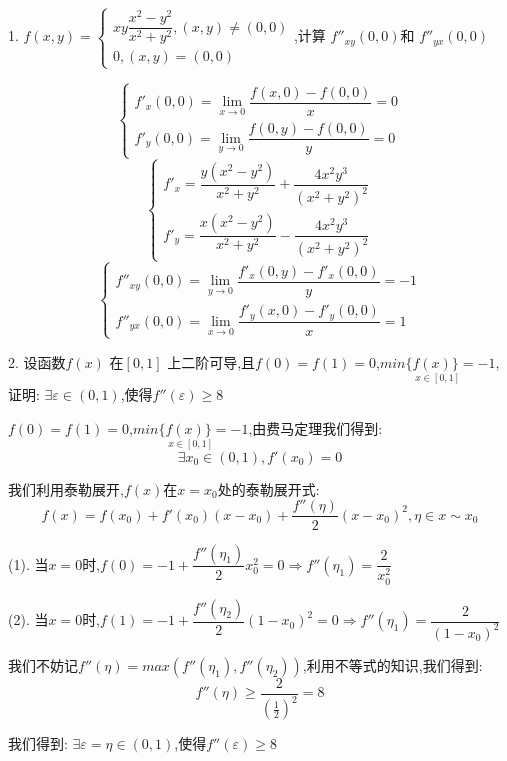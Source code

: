 1. $f(x,y)=\left\lbrace
\begin{array}{l}
	xy\dfrac{x^2-y^2}{x^2+y^2},(x,y)\neq (0,0)\\
	0,(x,y)=(0,0)
\end{array} \right. $,计算 $f''_{xy}(0,0)$和 $f''_{yx}(0,0)$
\begin{solution}
	$$\left\lbrace
	\begin{array}{l}
		f'_{x}(0,0)=\lim\limits_{x\rightarrow 0}\dfrac{f(x,0)-f(0,0)}{x}=0\\
		f'_{y}(0,0)=\lim\limits_{y\rightarrow 0}\dfrac{f(0,y)-f(0,0)}{y}=0
	\end{array}
	\right. $$
	$$\left\lbrace 
	\begin{array}{l}
		f'_{x}=\dfrac{y(x^2-y^2)}{x^2+y^2}+\dfrac{4x^2y^3}{(x^2+y^2)^2}\\
		f'_{y}=\dfrac{x(x^2-y^2)}{x^2+y^2}-\dfrac{4x^2y^3}{(x^2+y^2)^2}
	\end{array}
	\right. $$
	$$\left\lbrace
	\begin{array}{l}
		f''_{xy}(0,0)=\lim\limits_{y\rightarrow 0}\dfrac{f'_{x}(0,y)-f'_{x}(0,0)}{y}=-1\\
		f''_{yx}(0,0)=\lim\limits_{x\rightarrow 0}\dfrac{f'_{y}(x,0)-f'_{y}(0,0)}{x}=1
	\end{array}
	\right. $$
\end{solution}


2. 设函数$f(x)$ 在$[0,1]$ 上二阶可导,且$f(0)=f(1)=0$,$\underset{x\in [0,1]}{min \{f(x)\}=-1}$,证明: $\exists \varepsilon \in(0,1)$,使得$f''(\varepsilon)\geq 8$
\begin{solution}
	
	$f(0)=f(1)=0$,$\underset{x\in [0,1]}{min \{f(x)\}=-1}$,由费马定理我们得到: 
	$$\exists x_{0}\in(0,1),f'(x_{0})=0$$
	
	我们利用泰勒展开,$f(x)$在$x=x_{0}$处的泰勒展开式: 
	$$f(x)=f(x_{0})+f'(x_{0})(x-x_{0})+\frac{f''(\eta)}{2}(x-x_{0})^2,\eta \in x\sim x_{0} $$
	
	(1). 当$x=0$时,$f(0)=-1+\dfrac{f''(\eta_{1})}{2}x_{0}^2=0\Rightarrow f''(\eta_{1})=\dfrac{2}{x_{0}^2}$
	
	(2). 当$x=0$时,$f(1)=-1+\dfrac{f''(\eta_{2})}{2}(1-x_{0})^2=0\Rightarrow f''(\eta_{1})=\dfrac{2}{(1-x_{0})^2}$
	
	我们不妨记$f''(\eta)=max(f''(\eta_{1}),f''(\eta_{2}))$,利用不等式的知识,我们得到: 
	$$f''(\eta)\geq \frac{2}{(\frac{1}{2})^2}=8$$
	
	我们得到: $\exists \varepsilon=\eta \in(0,1)$,使得$f''(\varepsilon)\geq 8$
\end{solution}

